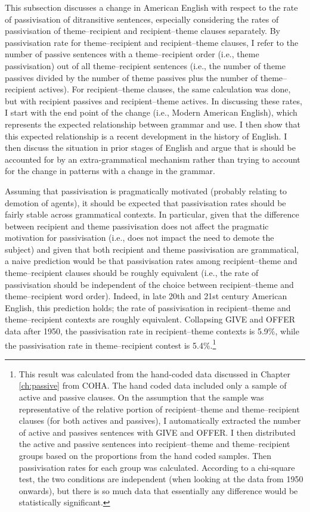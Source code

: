 	This subsection discusses a change in American English with respect to the rate of passivisation of ditransitive sentences, especially considering the rates of passivisation of theme--recipient and recipient--theme clauses separately. By passivisation rate for theme--recipient and recipient--theme clauses, I refer to the number of passive sentences with a theme--recipient order (i.e., theme passivisation) out of all theme--recipient sentences (i.e., the number of theme passives divided by the number of theme passives plus the number of theme--recipient actives). For recipient--theme clauses, the same calculation was done, but with recipient passives and recipient--theme actives. In discussing these rates, I start with the end point of the change (i.e., Modern American English), which represents the expected relationship between grammar and use. I then show that this expected relationship is a recent development in the history of English. I then discuss the situation in prior stages of English and argue that is should be accounted for by an extra-grammatical mechanism rather than trying to account for the change in patterns with a change in the grammar.

	Assuming that passivisation is pragmatically motivated (probably relating to demotion of agents), it should be expected that passivisation rates should be fairly stable across grammatical contexts. In particular, given that the difference between recipient and theme passivisation does not affect the pragmatic motivation for passivisation (i.e., does not impact the need to demote the subject) and given that both recipient and theme passivisation are grammatical, a naive prediction would be that passivisation rates among recipient--theme and theme--recipient clauses should be roughly equivalent (i.e., the rate of passivisation should be independent of the choice between recipient--theme and theme--recipient word order). Indeed, in late 20th and 21st century American English, this prediction holds; the rate of passivisation in recipient--theme and theme--recipient contexts are roughly equivalent. Collapsing GIVE and OFFER data after 1950, the passivisation rate in recipient--theme contexts is 5.9\%, while the passivisation rate in theme--recipient contest is 5.4\%.\footnote{This result was calculated from the hand-coded data discussed in Chapter \ref{ch:passive} from COHA. The hand coded data included only a sample of active and passive clauses. On the assumption that the sample was representative of the relative portion of recipient--theme and theme--recipient clauses (for both actives and passives), I automatically extracted the number of active and passives sentences with GIVE and OFFER. I then distributed the active and passive sentences into recipient--theme and theme--recipient groups based on the proportions from the hand coded samples. Then passivisation rates for each group was calculated. According to a chi-square test, the two conditions are independent (when looking at the data from 1950 onwards), but there is so much data that essentially any difference would be statistically significant.}
	
